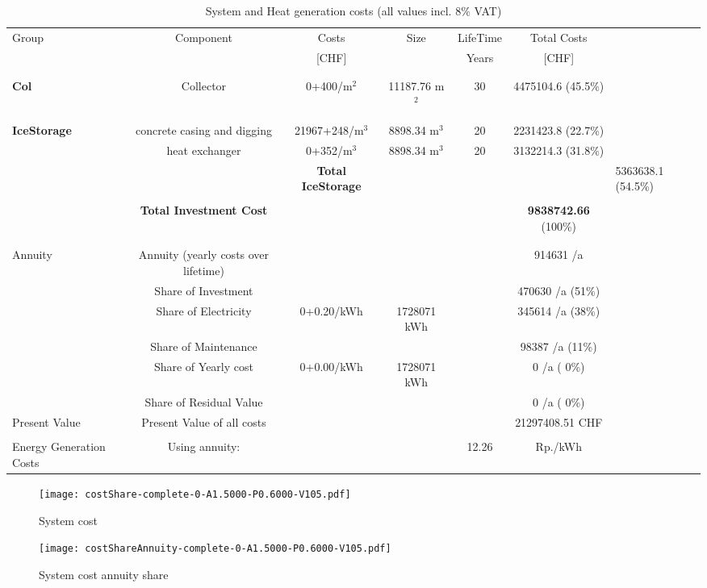\documentclass[english]{SPFShortReport}
\begin{document}
\begin{table}[!ht]
\centering
\caption{System and Heat generation costs (all values incl. 8$\%$ VAT) }
\begin{adjustbox}{max width =\textwidth}
\begin{tabular}{l | c c c c c } 
\hline
\hline
Group &Component &Costs &Size &LifeTime &Total Costs \\ 
 & &[CHF] & &Years &[CHF]\\ 
\hline
\\
\hline \\
\textbf{Col} & Collector & 0+400/m$^2$ & 11187.76 m$^2$ & 30 & 4475104.6 (45.5\%) \\
\hline \\
\hline \\
\textbf{IceStorage} & concrete casing and digging & 21967+248/m$^3$ & 8898.34 m$^3$ & 20 & 2231423.8 (22.7\%) \\
 & heat exchanger & 0+352/m$^3$ & 8898.34 m$^3$ & 20 & 3132214.3 (31.8\%) \\
&
 & \textbf{Total IceStorage} & & & & 5363638.1 (54.5\%) \\
\hline \\
 & \textbf{Total Investment Cost} & & & & \textbf{9838742.66} (100\%) \\ 
\hline \\ 
\hline \\ 
Annuity & Annuity (yearly costs over lifetime)  &&& & 914631 /a  \\
 & Share of Investment & &&& 470630 /a (51\%) \\
 & Share of Electricity & 0+0.20/kWh & 1728071 kWh &  & 345614 /a (38\%)\\
 & Share of Maintenance & &&& 98387 /a (11\%)\\ 
 & Share of Yearly cost & 0+0.00/kWh & 1728071 kWh & &  0 /a ( 0\%)\\
 & Share of Residual Value &&& &  0 /a ( 0\%)\\
Present Value  & Present Value of all costs  & &&& 21297408.51 CHF \\
\hline \\ 
 Energy Generation Costs & Using annuity: &&& 12.26 & Rp./kWh \\
\hline
\hline
\end{tabular}
\end{adjustbox}
\label{CostsTable}
\end{table}
\begin{figure}[!htbp]
\begin{center}
\texttt{[image: costShare-complete-0-A1.5000-P0.6000-V105.pdf]}
\caption{System cost}
\label{systemCost}
\end{center}
\end{figure}
\begin{figure}[!htbp]
\begin{center}
\texttt{[image: costShareAnnuity-complete-0-A1.5000-P0.6000-V105.pdf]}
\caption{System cost annuity share}
\label{systemCostannuity}
\end{center}
\end{figure}
\end{document}
